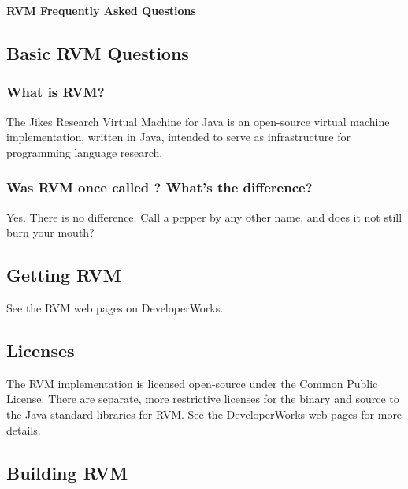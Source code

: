 \begin{center}
{\bf RVM Frequently Asked Questions}
\end{center}


\subsection{Basic RVM Questions}

\subsubsection{What is RVM?}

The Jikes Research Virtual Machine for Java is an open-source virtual machine
implementation, written in Java, intended to serve as infrastructure for
programming language research.

\subsubsection{Was RVM once called \jp? What's the difference?}

Yes. There is no difference.  Call a pepper by any other name, and does it
not still burn your mouth?

\subsection{Getting RVM}

See the RVM web pages on DeveloperWorks.

\subsection{Licenses}

The RVM implementation is licensed open-source under the Common Public
License.  There are separate, more restrictive licenses for the binary and 
source to the Java standard libraries for RVM.  See the DeveloperWorks
web pages for more details.

\subsection{Building RVM}

